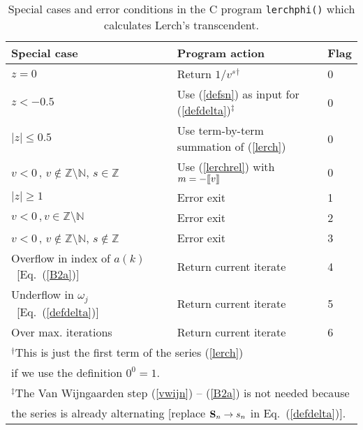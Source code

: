 \documentclass[11pt]{article}
\def\trunc#1{[\mkern - 2.5 mu  [#1] \mkern - 2.5 mu ]}
\begin{document}
\begin{table}[htb!]
\begin{center}
\begin{minipage}{16cm}
\begin{center}
%
\begin{tabular}{lll}
\hline
Special case & Program action & Flag \\
\hline
$z=0$ & Return $1/v^s$$^{\dagger}$ & 0\\
%
$z<-0.5$ & Use (\ref{defsn}) as input for (\ref{defdelta})$^{\ddagger}$ & 0 \\
%
$|z| \leq 0.5$ & Use term-by-term summation of (\ref{lerch}) & 0\\
%
$v<0\,,\,v \not \in \mathbb{Z} \setminus \mathbb{N}$, $s \in \mathbb{Z}$ 
& 
Use (\ref{lerchrel}) with $m=-\trunc{v}$ \hspace*{5mm} & 0 \\
%
$\vert z \vert \geq 1$ & 
Error exit & 1 \\
%
$v<0\,,v\in \mathbb{Z} \setminus \mathbb{N}$ & 
Error exit & 2 \\
%
$v<0\,,\,v \not \in \mathbb{Z} \setminus \mathbb{N}$, $s \not \in 
\mathbb{Z}$ & 
Error exit & 3 \\
%
Overflow in index of $a(k)$~[Eq.~(\ref{B2a})] \hspace*{5mm} & 
Return current iterate & 4 \\
%
Underflow in $\omega_{j}$~[Eq.~(\ref{defdelta})] & 
Return current iterate & 5 \\
%
Over max. iterations & 
Return current iterate & 6 \\
%
\hline
\multicolumn{3}{l}{$^{\dagger}$This is just the first term of the series 
  (\ref{lerch})}\\
\multicolumn{3}{l}{\hspace*{3mm} if we use the definition $0^0=1$.} \\[1ex]
\multicolumn{3}{l}{$^{\ddagger}$The Van Wijngaarden step (\ref{vwijn}) -- (\ref{B2a})
  is not needed because} \\
\multicolumn{3}{l}{\hspace*{3mm} the series is already alternating 
[replace ${\bf S}_n \to s_n$ in Eq.~(\ref{defdelta})].}\\
\hline
\end{tabular}
%
\caption{Special cases and error conditions in the C program 
{\tt lerchphi()} which calculates Lerch's transcendent.}
\label{cerr}
%
\end{center}
\end{minipage}
\end{center}
%
\end{table}
\end{document}
